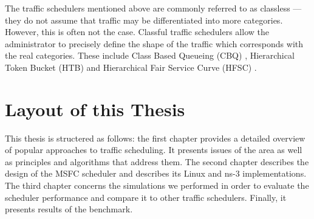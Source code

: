 The traffic schedulers mentioned above are commonly referred to as classless --- they do not assume that traffic may be differentiated into more categories. However, this is often not the case. Classful traffic schedulers allow the administrator to precisely define the shape of the traffic which corresponds with the real categories. These include Class Based Queueing (CBQ) \cite{CBQ}, Hierarchical Token Bucket (HTB) \cite{HTB} and Hierarchical Fair Service Curve (HFSC) \cite{HFSC}.

\section*{Layout of this Thesis}
This thesis is structered as follows: the first chapter provides a detailed overview of popular approaches to traffic scheduling. It presents issues of the area as well as principles and algorithms that address them. The second chapter describes the design of the MSFC scheduler and describes its Linux and ns-3 implementations. The third chapter concerns the simulations we performed in order to evaluate the scheduler performance and compare it to other traffic schedulers. Finally, it presents results of the benchmark.

